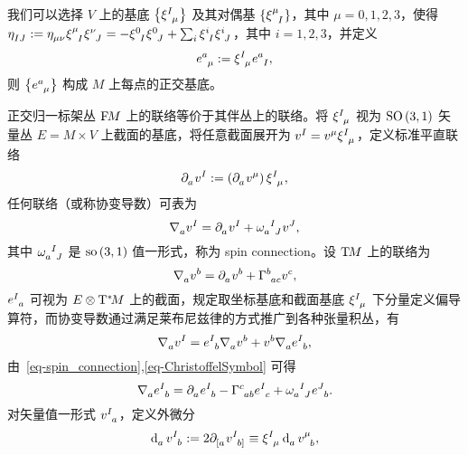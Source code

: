 		我们可以选择 $V$ 上的基底 $\left\{ \tensor{\xi}{^I_\mu} \right\}$ 及其对偶基 $\left\{ \tensor{\xi}{^\mu_I} \right\}$，其中 $\mu=0,1,2,3$，使得 $\tensor{\eta}{_I_J} \definedby \tensor{\eta}{_\mu_\nu} \tensor{\xi}{^\mu_I} \tensor{\xi}{^\nu_J} = -\tensor{\xi}{^0_I} \tensor{\xi}{^0_J} + \sum_i \tensor{\xi}{^i_I} \tensor{\xi}{^i_J}$，其中 $i=1,2,3$，并定义
		\begin{equation}
			\tensor{e}{^a_\mu} \definedby \tensor{\xi}{^I_\mu} \tensor{e}{^a_I},
		\end{equation}
		则 $\left\{ \tensor{e}{^a_\mu} \right\}$ 构成 $M$ 上每点的正交基底。

		正交归一标架丛 $\mathrm{F}_{{}}\!{M}$ 上的联络等价于其伴丛上的联络。将 $\tensor{\xi}{^I_\mu}$ 视为 $\mathrm{SO}\left(3,1\right)$ 矢量丛 $E = M \times V$ 上截面的基底，将任意截面展开为 $\tensor{v}{^I} = \tensor{v}{^\mu} \tensor{\xi}{^I_\mu}$，定义标准平直联络
		\begin{equation}
			\Partial{a} \tensor{v}{^I} \definedby \left( \Partial{a} \tensor{v}{^\mu} \right) \tensor{\xi}{^I_\mu},
		\end{equation}
		任何联络（或称协变导数）可表为
		\begin{equation}
			\Nabla{a} \tensor{v}{^I} = \Partial{a} \tensor{v}{^I} + \tensor{\omega}{_a^I_J} \tensor{v}{^J},\label{eq-spin_connection}
		\end{equation}
		其中 $\tensor{\omega}{_a^I_J}$ 是 $\mathrm{so}\left( 3,1 \right)$ 值一形式，称为 spin connection。设 $\mathrm{T}_{{}}\!{M}$ 上的联络为
		\begin{equation}
			\Nabla{a} \tensor{v}{^b} = \Partial{a} \tensor{v}{^b} + \ChristoffelSymbol{b}{a}{c} \tensor{v}{^c},\label{eq-ChristoffelSymbol}
		\end{equation}
		$\tensor{e}{^I_a}$ 可视为 $E \otimes \mathrm{T}^*_{{}}\!{M}$ 上的截面，规定取坐标基底和截面基底 $\tensor{\xi}{^I_\mu}$ 下分量定义偏导算符，而协变导数通过满足莱布尼兹律的方式推广到各种张量积丛，有
		\begin{equation}
			\Nabla{a} \tensor{v}{^I} = \tensor{e}{^I_b} \Nabla{a} \tensor{v}{^b} + \tensor{v}{^b} \Nabla{a} \tensor{e}{^I_b},
		\end{equation}
		由~\eqref{eq-spin_connection},\eqref{eq-ChristoffelSymbol} 可得
		\begin{equation}
			\Nabla{a} \tensor{e}{^I_b} = \Partial{a} \tensor{e}{^I_b} - \ChristoffelSymbol{c}{a}{b} \tensor{e}{^I_c} + \tensor{\omega}{_a^I_J} \tensor{e}{^J_b}.
		\end{equation}
		对矢量值一形式 $\tensor{v}{^I_a}$，定义外微分
		\begin{equation}
			\tensor{\dd{}}{_a} {\tensor{v}{^I_b}} \definedby 2 \Partial{{[a}} \tensor{v}{^I_{b]}} \equiv \tensor{\xi}{^I_\mu} \tensor{\dd{}}{_a} {\tensor{v}{^\mu_b}},
		\end{equation}
